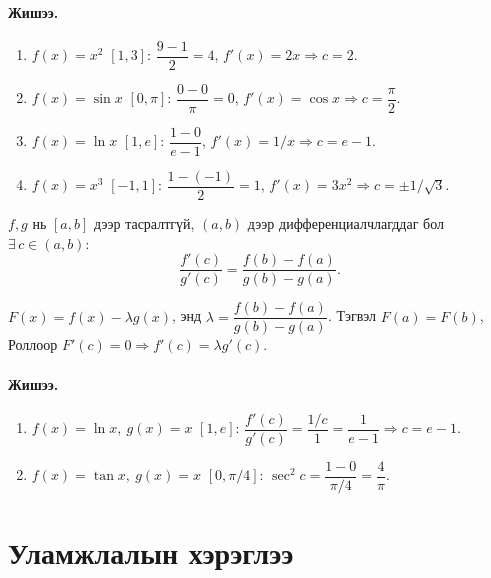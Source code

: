 \paragraph{Жишээ.} 
\begin{enumerate}[itemsep=2pt]
\item $f(x)=x^2$ $[1,3]$: $\dfrac{9-1}{2}=4$, $f'(x)=2x\Rightarrow c=2$.
\item $f(x)=\sin x$ $[0,\pi]$: $\dfrac{0-0}{\pi}=0$, $f'(x)=\cos x\Rightarrow c=\dfrac{\pi}{2}$.
\item $f(x)=\ln x$ $[1,e]$: $\dfrac{1-0}{e-1}$, $f'(x)=1/x\Rightarrow c=e-1$.
\item $f(x)=x^3$ $[-1,1]$: $\dfrac{1-(-1)}{2}=1$, $f'(x)=3x^2\Rightarrow c=\pm 1/\sqrt{3}$.
\end{enumerate}
\begin{theorem}
$f,g$ нь $[a,b]$ дээр тасралтгүй, $(a,b)$ дээр дифференциалчлагддаг бол $\exists\,c\in(a,b)$:
\[
\frac{f'(c)}{g'(c)}=\frac{f(b)-f(a)}{g(b)-g(a)}.
\]
\end{theorem}

\begin{prof}
$F(x)=f(x)-\lambda g(x)$, энд $\lambda=\dfrac{f(b)-f(a)}{g(b)-g(a)}$. Тэгвэл $F(a)=F(b)$, Роллоор $F'(c)=0\Rightarrow f'(c)=\lambda g'(c)$.
\end{prof}

\paragraph{Жишээ.}
\begin{enumerate}[itemsep=2pt]
\item $f(x)=\ln x,\ g(x)=x$ $[1,e]$: $\dfrac{f'(c)}{g'(c)}=\dfrac{1/c}{1}=\dfrac{1}{e-1}\Rightarrow c=e-1$.
\item $f(x)=\tan x,\ g(x)=x$ $[0,\pi/4]$: $\sec^2 c=\dfrac{1-0}{\pi/4}=\dfrac{4}{\pi}$.
\end{enumerate}

\section{Уламжлалын хэрэглээ}
